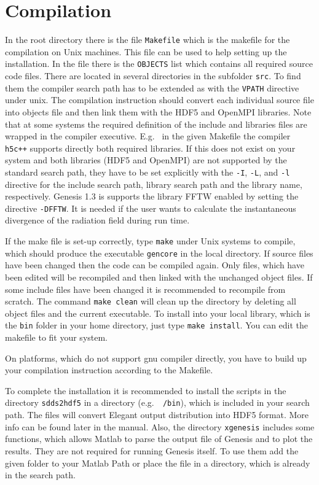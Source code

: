 \documentclass[12pt]{book}
\begin{document}
\section{\sf Compilation}
In the root directory there is the file {\tt Makefile} which is the makefile for the compilation on Unix machines. This file can be used to help setting up the installation. In the file there is the {\tt OBJECTS} list which contains all required source code files. There are located in several directories in the subfolder {\tt src}. To find them the compiler search path has to be extended as with the {\tt VPATH} directive under unix. The compilation instruction should convert each individual source file into objects file and then link them with the HDF5 and OpenMPI libraries. Note that at some systems the required definition of the include and libraries files are wrapped in the compiler executive. E.g.~ in the given Makefile the compiler {\tt h5c++} supports directly both required libraries. If this does not exist on your system and both libraries (HDF5 and OpenMPI) are not supported by the standard search path, they have to be set explicitly with the {\tt -I}, {\tt -L}, and {\tt -l} directive for the include search path, library search path  and the library name, respectively. Genesis 1.3 is supports the library FFTW enabled by setting the directive {\tt -DFFTW}. It is needed if the user wants to calculate the instantaneous divergence of the radiation field during run time.

If the make file is set-up correctly, type {\tt make} under Unix systems to compile, which should produce the executable {\tt gencore} in the local directory. If source files have been changed then the code can be compiled again. Only files, which have been edited will be recompiled and then linked with the unchanged object files. If some include files have been changed it is recommended to recompile from scratch. The command {\tt make clean} will clean up the directory by deleting all object files and the current executable. To install into your local library, which is the {\tt bin} folder in your home directory, just type {\tt make install}. You can edit the makefile to fit your system.

On platforms, which do not support gnu compiler directly, you have to build up your compilation instruction according to the Makefile.


To complete the installation it is recommended to install the scripts in the directory {\tt sdds2hdf5} in a directory (e.g.~{\tt ~/bin}), which is included in your search path. The files will convert Elegant output distribution into HDF5 format. More info can be found later in the manual. Also, the directory {\tt xgenesis} includes some functions, which allows Matlab to parse the output file of Genesis and to plot the results. They are not required for running Genesis itself. To use them add the given folder to your Matlab Path or place the file in a directory, which is already in the search path.
\end{document}
